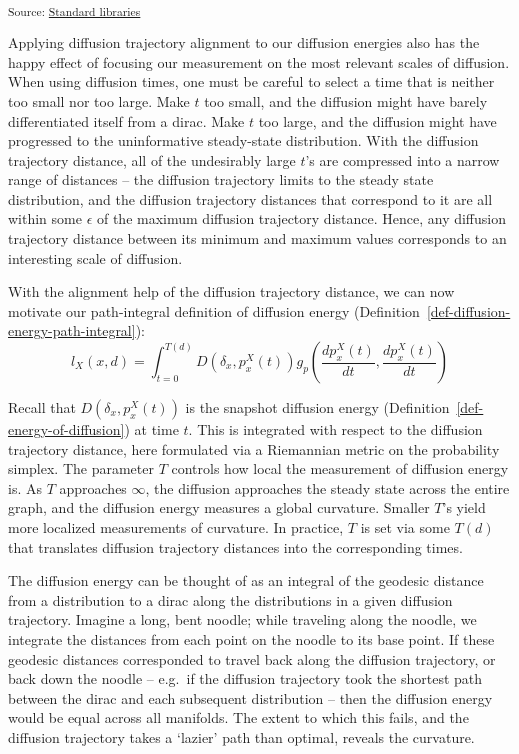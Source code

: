 \documentclass[
  letterpaper,
  DIV=11,
  numbers=noendperiod]{scrartcl}
\theoremstyle{plain}
\theoremstyle{definition}
\theoremstyle{plain}
\theoremstyle{definition}
\theoremstyle{plain}
\theoremstyle{remark}
\begin{document}
\textsubscript{Source:
\href{https://professorwug.github.io/diffusion-curvature//Users/boreas/Pumberton/Workshop/21-SUMRY-Curvature/diffusion-curvature/nbs/3d-diffusion-trajectory-distance-normalization.ipynb.html\#cell-fig-curvature-curves}{Standard
libraries}}

Applying diffusion trajectory alignment to our diffusion energies also
has the happy effect of focusing our measurement on the most relevant
scales of diffusion. When using diffusion times, one must be careful to
select a time that is neither too small nor too large. Make \(t\) too
small, and the diffusion might have barely differentiated itself from a
dirac. Make \(t\) too large, and the diffusion might have progressed to
the uninformative steady-state distribution. With the diffusion
trajectory distance, all of the undesirably large \(t\)'s are compressed
into a narrow range of distances -- the diffusion trajectory limits to
the steady state distribution, and the diffusion trajectory distances
that correspond to it are all within some \(\epsilon\) of the maximum
diffusion trajectory distance. Hence, any diffusion trajectory distance
between its minimum and maximum values corresponds to an interesting
scale of diffusion.

With the alignment help of the diffusion trajectory distance, we can now
motivate our path-integral definition of diffusion energy
(Definition~\ref{def-diffusion-energy-path-integral}): \[
l_{X}(x, d)= \int_{t=0}^{T(d)} D\left(\delta_x, p_x^X(t)\right) g_p\left(\frac{d p_x^X(t)}{d t}, \frac{ d p_x^X(t) }{d t} \right)
\]

Recall that \(D(\delta_{x}, p_{x}^X(t))\) is the snapshot diffusion
energy (Definition~\ref{def-energy-of-diffusion}) at time \(t\). This is
integrated with respect to the diffusion trajectory distance, here
formulated via a Riemannian metric on the probability simplex. The
parameter \(T\) controls how local the measurement of diffusion energy
is. As \(T\) approaches \(\infty\), the diffusion approaches the steady
state across the entire graph, and the diffusion energy measures a
global curvature. Smaller \(T\)'s yield more localized measurements of
curvature. In practice, \(T\) is set via some \(T(d)\) that translates
diffusion trajectory distances into the corresponding times.

The diffusion energy can be thought of as an integral of the geodesic
distance from a distribution to a dirac along the distributions in a
given diffusion trajectory. Imagine a long, bent noodle; while traveling
along the noodle, we integrate the distances from each point on the
noodle to its base point. If these geodesic distances corresponded to
travel back along the diffusion trajectory, or back down the noodle --
e.g.~if the diffusion trajectory took the shortest path between the
dirac and each subsequent distribution -- then the diffusion energy
would be equal across all manifolds. The extent to which this fails, and
the diffusion trajectory takes a `lazier' path than optimal, reveals the
curvature.
\end{document}
